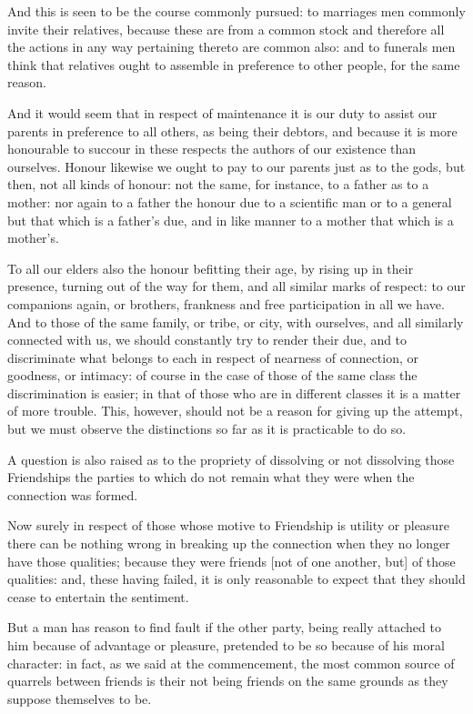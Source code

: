 And this is seen to be the course commonly pursued: to marriages men commonly
invite their relatives, because these are from a common stock and therefore all
the actions in any way pertaining thereto are common also: and to funerals men
think that relatives ought to assemble in preference to other people, for the
same reason.

And it would seem that in respect of maintenance it is our duty to assist our
parents in preference to all others, as being their debtors, and because it is
more honourable to succour in these respects the authors of our existence than
ourselves. Honour likewise we ought to pay to our parents just as to the gods,
but then, not all kinds of honour: not the same, for instance, to a father as
to a mother: nor again to a father the honour due to a scientific man or to a
general but that which is a father’s due, and in like manner to a mother
that which is a mother’s.

To all our elders also the honour befitting their age, by rising up in their
presence, turning out of the way for them, and all similar marks of respect: to
our companions again, or brothers, frankness and free participation in all we
have. And to those of the same family, or tribe, or city, with ourselves, and
all similarly connected with us, we should constantly try to render their due,
and to discriminate what belongs to each in respect of nearness of connection,
or goodness, or intimacy: of course in the case of those of the same class the
discrimination is easier; in that of those who are in different classes it is a
matter of more trouble. This, however, should not be a reason for giving up the
attempt, but we must observe the distinctions so far as it is practicable to do
so.


A question is also raised as to the propriety of dissolving or not dissolving
those Friendships the parties to which do not remain what they were when the
connection was formed.

Now surely in respect of those whose motive to Friendship is utility or
pleasure there can be nothing wrong in breaking up the connection when they no
longer have those qualities; because they were friends [not of one another,
but] of those qualities: and, these having failed, it is only reasonable to
expect that they should cease to entertain the sentiment.

But a man has reason to find fault if the other party, being really attached to
him because of advantage or pleasure, pretended to be so because of his moral
character: in fact, as we said at the commencement, the most common source of
quarrels between friends is their not being friends on the same grounds as they
suppose themselves to be.

